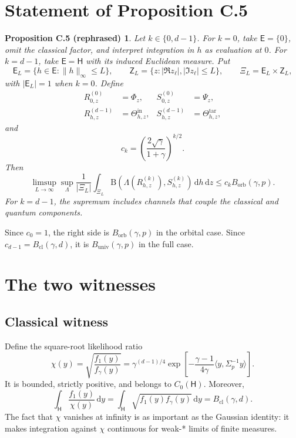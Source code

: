 \documentclass[11pt]{article}
\newcommand{\Hc}{\mathsf H}
\newcommand{\dd}{\,\mathrm d}
\newcommand{\B}{\mathrm B}
\newcommand{\Bcl}{B_{\mathrm{cl}}}
\newcommand{\Borb}{B_{\mathrm{orb}}}
\newcommand{\Buniv}{B_{\mathrm{univ}}}
\newtheorem*{propC}{Proposition C.5 (rephrased)}
\begin{document}
\section{Statement of Proposition C.5}

\begin{propC}
Let $k\in\{0,d-1\}$.  For $k=0$, take $\mathsf E=\{0\}$, omit the
classical factor, and interpret integration in $h$ as evaluation at $0$.
For $k=d-1$, take $\mathsf E=\Hc$ with its induced Euclidean measure.  Put
\[
  \mathsf E_L=\{h\in\mathsf E:\|h\|_\infty\leq L\},
  \qquad
  \mathsf Z_L=\{z:|\Re z_\ell|,|\Im z_\ell|\leq L\},
  \qquad
  \Xi_L=\mathsf E_L\times\mathsf Z_L,
\]
with $|\mathsf E_L|=1$ when $k=0$.  Define
\begin{align*}
  R_{0,z}^{(0)}&=\Phi_z,
  &S_{0,z}^{(0)}&=\Psi_z,\\
  R_{h,z}^{(d-1)}&=\Theta_{h,z}^{\mathrm{in}},
  &S_{h,z}^{(d-1)}&=\Theta_{h,z}^{\mathrm{tar}},
\end{align*}
and
\[
  c_k=\left(\frac{2\sqrt\gamma}{1+\gamma}\right)^{k/2}.
\]
Then
\[
  \limsup_{L\to\infty}\sup_\Lambda
  \frac1{|\Xi_L|}\int_{\Xi_L}
  \B\!\left(\Lambda(R_{h,z}^{(k)}),S_{h,z}^{(k)}\right)\dd h\dd z
  \leq c_k\Borb(\gamma,p).
\]
For $k=d-1$, the supremum includes channels that couple the classical and
quantum components.
\end{propC}

Since $c_0=1$, the right side is $\Borb(\gamma,p)$ in the orbital case.
Since $c_{d-1}=\Bcl(\gamma,d)$, it is $\Buniv(\gamma,p)$ in the full case.

\section{The two witnesses}

\subsection{Classical witness}

Define the square-root likelihood ratio
\begin{equation}\label{eq:chi}
  \chi(y)=\sqrt{\frac{f_1(y)}{f_\gamma(y)}}
  =\gamma^{(d-1)/4}
  \exp\!\left[-\frac{\gamma-1}{4\gamma}
  \langle y,\Sigma_p^{-1}y\rangle\right].
\end{equation}
It is bounded, strictly positive, and belongs to $C_0(\Hc)$.  Moreover,
\begin{equation}\label{eq:classical-id}
  \int_{\Hc}\frac{f_1(y)}{\chi(y)}\dd y
  =\int_{\Hc}\sqrt{f_1(y)f_\gamma(y)}\dd y
  =\Bcl(\gamma,d).
\end{equation}
The fact that $\chi$ vanishes at infinity is as important as the Gaussian
identity: it makes integration against $\chi$ continuous for weak-* limits
of finite measures.
\end{document}
